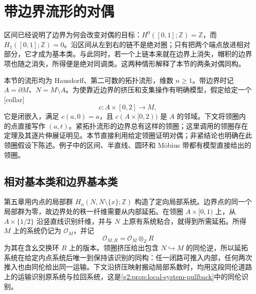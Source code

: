 
% 
% 

\section{带边界流形的对偶}
\label{g2:sec:0604}

区间已经说明了边界为何会改变对偶的目标：\(H^0([0,1];\mathbb Z)=\mathbb Z\)，而 \(H_1([0,1];\mathbb Z)=0\)。沿区间从左到右的链不是绝对圈；只有把两个端点放进相对部分，它才成为基本类。与此同时，若一个上链本来就在边界上消失，帽积的边界项也随之消失，所得便是绝对同调类。这两种情形解释了本节的两条对偶同构。

\ProseParagraphBreak

本节的流形均为 Hausdorff、第二可数的拓扑流形，维数 \(n\geq1\)。带边界时记 \(A=\partial M\)、\(N=M\setminus A\)。为使靠近边界的挤压和支集操作有明确模型，假定给定一个[collar]
\[
	c:A\times[0,2]\longrightarrow M,
\]
它是闭嵌入，满足 \(c(a,0)=a\)，且 \(c(A\times[0,2))\) 是 \(A\) 的邻域。下文将领圈内的点直接写作 \((a,t)\)。紧拓扑流形的边界总有这样的领圈；这里调用的领圈存在定理及其逐片伸展证明见\cite[第3.3节，Other Forms of Duality]{Hatcher2002}。本节直接利用给定领圈证明对偶；非紧结论也明确在此领圈假设下陈述。例子中的区间、半直线、圆环和 Möbius 带都有模型直接给出的领圈。

\subsection{相对基本类和边界基本类}
\label{g2:subsec:0604:01}
第五章用内点的局部群 \(H_n(N,N\setminus\{x\};\mathbb Z)\) 构造了定向局部系统。边界点的同一个局部群为零，故边界处的秩一纤维需要从内部延拓。在领圈 \(A\times[0,1)\) 上，从 \(A\times\{1/2\}\) 沿竖直线识别纤维，并与 \(N\) 上原有系统粘合，就得到所需延拓。所得 \(M\) 上的系统仍记为 \(\mathcal O_M\)，并记
\[
	\mathcal O_{M,R}=\mathcal O_M\otimes_{\mathbb Z}R
\]
为其在含幺交换环 \(R\) 上的版本。领圈挤压给出包含 \(N\hookrightarrow M\) 的同伦逆，所以延拓系统在给定内点系统后唯一到保持该识别的同构：任一闭路可推入内部，任何两次推入也由同伦给出同一运输。下文沿挤压映射搬动局部系数时，均用这段同伦道路上的运输识别原系统与拉回系统，这是\cref{g2:prop:local-system-pullback}中的同伦识别。


